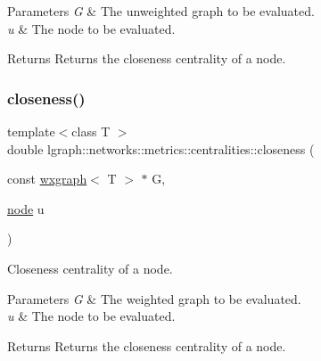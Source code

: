 \begin{DoxyParams}{Parameters}
{\em G} & The unweighted graph to be evaluated. \\
\hline
{\em u} & The node to be evaluated. \\
\hline
\end{DoxyParams}
\begin{DoxyReturn}{Returns}
Returns the closeness centrality of a node. 
\end{DoxyReturn}
\mbox{\label{namespacelgraph_1_1networks_1_1metrics_1_1centralities_a641608dcaecba5d3636237bd15da2e96}} 
\subsubsection{\texorpdfstring{closeness()}{closeness()}\hspace{0.1cm}{\footnotesize\ttfamily [2/6]}}
{\footnotesize\ttfamily template$<$class T $>$ \\
double lgraph\+::networks\+::metrics\+::centralities\+::closeness (\begin{DoxyParamCaption}\item[{const \hyperlink{classlgraph_1_1wxgraph}{wxgraph}$<$ T $>$ $\ast$}]{G,  }\item[{\hyperlink{namespacelgraph_a397169dd66adf725210a30fb7251773e}{node}}]{u }\end{DoxyParamCaption})}



Closeness centrality of a node. 


\begin{DoxyParams}{Parameters}
{\em G} & The weighted graph to be evaluated. \\
\hline
{\em u} & The node to be evaluated. \\
\hline
\end{DoxyParams}
\begin{DoxyReturn}{Returns}
Returns the closeness centrality of a node. 
\end{DoxyReturn}
\mbox{\label{namespacelgraph_1_1networks_1_1metrics_1_1centralities_aa7252de7745ee93430ddef0b64643077}} 
